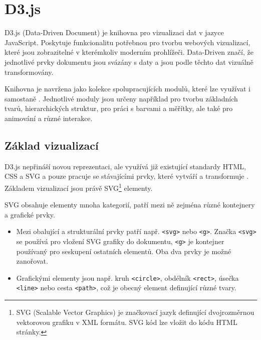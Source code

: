 \documentclass[
  digital, %
  oneside, %
  table,   %
  nolof,     %
  nolot,     %
]{fithesis3}
\begin{document}
\section{D3.js}
D3.js (Data-Driven Document) je knihovna pro vizualizaci dat v jazyce JavaScript. Poskytuje funkcionalitu potřebnou pro tvorbu webových vizualizací, které jsou zobrazitelné v kterémkoliv moderním prohlížeči. Data-Driven značí, že jednotlivé prvky dokumentu jsou svázány s daty a jsou podle těchto dat vizuálně transformovány. \par
Knihovna je navržena jako kolekce spolupracujících modulů, které lze využívat i samostaně \cite{d3APIReference}. Jednotlivé moduly jsou určeny například pro tvorbu základních tvarů, hierarchických struktur, pro práci s barvami a měřítky, ale také pro animování a různé interakce.

\subsection{Základ vizualizací}
D3.js nepřináší novou reprezentaci, ale využívá již existující standardy HTML, CSS a SVG a pouze pracuje se stávajícími prvky, které vytváří a transformuje \cite{d3jsorg}. Základem vizualizací jsou právě SVG\footnote{SVG (Scalable Vector Graphics) je značkovací jazyk definující dvojrozměrnou vektorovou grafiku v XML formátu. SVG kód lze vložit do kódu HTML stránky.} elementy.\par
SVG obsahuje elementy mnoha kategorií, patří mezi ně zejména různé kontejnery a grafické prvky. \cite{svgMozillaorg}
\begin{itemize}
  \item Mezi obalující a strukturální prvky patří např. \verb|<svg>| nebo \verb|<g>|. Značka \verb|<svg>| se používá pro vložení SVG grafiky do dokumentu, \verb|<g>| je kontejner používaný pro seskupení ostatních elementů. Oba dva prvky je možné zanořovat.
  \item Grafickými elementy jsou např. kruh \verb|<circle>|, obdélník \verb|<rect>|, úsečka \verb|<line>| nebo cesta \verb|<path>|, což je obecný element definující různé tvary.
\end{itemize}
\end{document}
